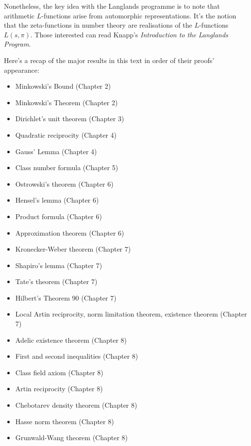 \documentclass[a4paper, 12pt,oneside,openany]{book}
\begin{document}
Nonetheless, the key idea with the Langlands programme is to note that arithmetic $L$-functions arise from automorphic representations. It's the notion that the zeta-functions in number theory are realisations of the $L$-functions $L(s, \pi)$. Those interested can read Knapp's \emph{Introduction to the Langlands Program}.

Here's a recap of the major results in this text in order of their proofs' appearance:

\begin{itemize}
	\item Minkowski's Bound (Chapter 2)
	\item Minkowski's Theorem (Chapter 2)
	\item Dirichlet's unit theorem (Chapter 3)
	\item Quadratic reciprocity (Chapter 4)
	\item Gauss' Lemma (Chapter 4)
	\item Class number formula (Chapter 5)
	\item Ostrowski's theorem (Chapter 6)
	\item Hensel's lemma (Chapter 6)
	\item Product formula (Chapter 6)
	\item Approximation theorem (Chapter 6)
	\item Kronecker-Weber theorem (Chapter 7)
	\item Shapiro's lemma (Chapter 7) 
	\item Tate's theorem (Chapter 7)
	\item Hilbert's Theorem 90 (Chapter 7)
	\item Local Artin reciprocity, norm limitation theorem, existence theorem (Chapter 7)
	\item Adelic existence theorem (Chapter 8)
	\item First and second inequalities (Chapter 8)
	\item Class field axiom (Chapter 8)
	\item Artin reciprocity (Chapter 8)
	\item Chebotarev density theorem (Chapter 8)
	\item Hasse norm theorem (Chapter 8)
	\item Grunwald-Wang theorem (Chapter 8)
\end{itemize}


\end{document}
